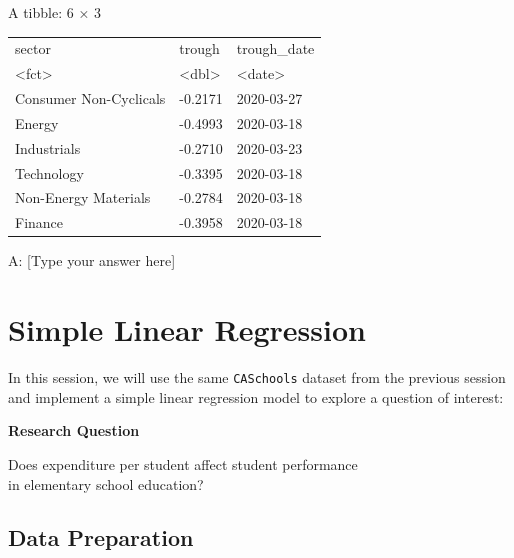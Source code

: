 \documentclass[
  12pt,
  a4paper,
]{scrbook}
\theoremstyle{plain}
\theoremstyle{definition}
\theoremstyle{remark}
\begin{document}
A tibble: 6 × 3
\begin{tabular}{lll}
 sector & trough & trough\_date\\
 <fct> & <dbl> & <date>\\
\hline
     Consumer Non-Cyclicals & -0.2171 & 2020-03-27\\
     Energy                 & -0.4993 & 2020-03-18\\
     Industrials            & -0.2710 & 2020-03-23\\
     Technology             & -0.3395 & 2020-03-18\\
     Non-Energy Materials   & -0.2784 & 2020-03-18\\
     Finance                & -0.3958 & 2020-03-18\\
\end{tabular}

A: {[}Type your answer here{]}

\chapter{Simple Linear Regression}\label{simple-linear-regression}

In this session, we will use the same \texttt{CASchools} dataset from
the previous session and implement a simple linear regression model to
explore a question of interest:

\begin{tcolorbox}[enhanced jigsaw, arc=.35mm, bottomrule=.15mm, breakable, colback=white, colframe=quarto-callout-important-color-frame, left=2mm, leftrule=.75mm, opacityback=0, rightrule=.15mm, toprule=.15mm]

\vspace{-3mm}\textbf{Research Question}\vspace{3mm}

Does expenditure per student affect student performance\\
in elementary school education?

\end{tcolorbox}

\section{Data Preparation}\label{data-preparation}
\end{document}

